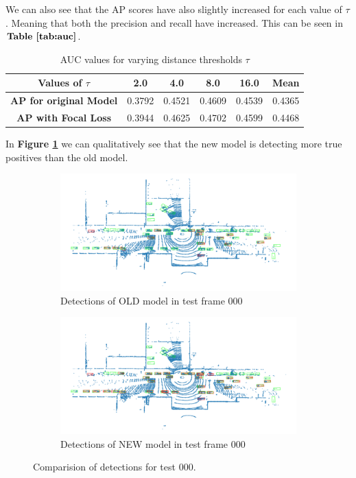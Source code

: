 \documentclass[letter]{article}
\newcommand{\fref}[1]{\textbf{Figure \ref{#1}}}
\begin{document}
	We can also see that the AP scores have also slightly increased for each value of $\tau$. Meaning that both the precision and recall have increased. This can be seen in $\textbf{Table \ref{tab:auc}}$.
	\begin{table}[!ht]
		\centering
		\begin{tabular}{|c|c|c|c|c|c|}
		\hline
		\textbf{Values of $\tau$} & 2.0 & 4.0 & 8.0 & 16.0 & \textbf{Mean} \\ \hline
		\textbf{AP for original Model} & 0.3792 & 0.4521 & 0.4609 & 0.4539 & 0.4365 \\ \hline
		\textbf{AP with Focal Loss} & 0.3944 & 0.4625 & 0.4702 & 0.4599 & 0.4468 \\ \hline
		\end{tabular}
		\caption{\label{tab:auc} AUC values for varying distance thresholds $\tau$}
	\end{table}

	In \fref{fig:comp-det} we can qualitatively see that the new model is detecting more true positives than the old model. 

	\begin{figure}[!h]
		\centering
		\begin{subfigure}[t]{0.49\textwidth}
			\centering
			\includegraphics[width=\linewidth]{images/000.png}
			\caption{Detections of OLD model in test frame 000}
		\end{subfigure}
		\begin{subfigure}[t]{0.49\textwidth}
			\centering
			\includegraphics[width=\linewidth]{images/000-focal.png}
			\caption{Detections of NEW model in test frame 000}
		\end{subfigure}
		\caption{Comparision of detections for test 000.}
		\label{fig:comp-det}
	\end{figure}
\end{document}
